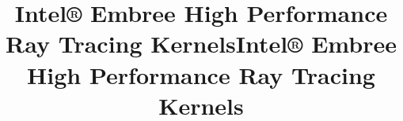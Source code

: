 \documentclass[oneside]{intelstyle/intel-spec}
\begin{document}
 {
  \title{Intel® Embree\baselineskip\LARGE
  \noindent High Performance Ray Tracing Kernels}
  \version{\embreeversion}
} {
  \title{Intel® Embree\baselineskip\LARGE
  \noindent High Performance Ray Tracing Kernels \\
  \embreeversion}
}

\maketitle
\setcounter{secnumdepth}{2}
\setcounter{tocdepth}{1}
\tableofcontents



 {
  \makedisclaimers
} {}
\end{document}
